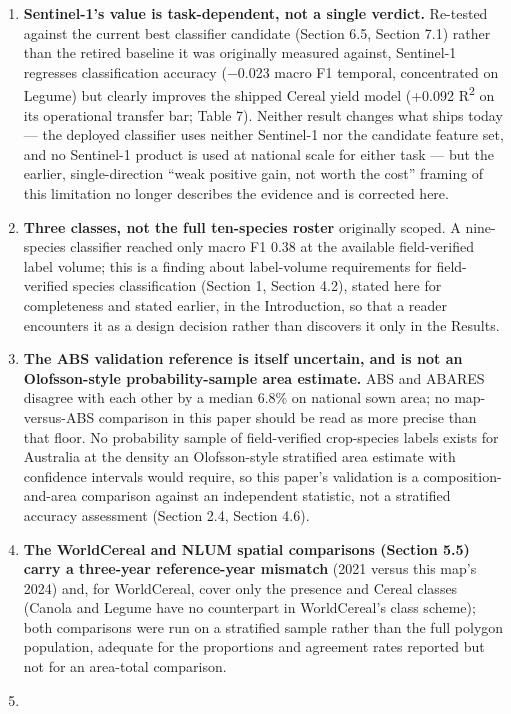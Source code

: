 \begin{enumerate}
\item
  \textbf{Sentinel-1's value is task-dependent, not a single verdict.} Re-tested against the current best classifier candidate (Section 6.5, Section 7.1) rather than the retired baseline it was originally measured against, Sentinel-1 regresses classification accuracy ($-$0.023 macro F1 temporal, concentrated on Legume) but clearly improves the shipped Cereal yield model (+0.092 R\textsuperscript{2} on its operational transfer bar; Table 7). Neither result changes what ships today --- the deployed classifier uses neither Sentinel-1 nor the candidate feature set, and no Sentinel-1 product is used at national scale for either task --- but the earlier, single-direction ``weak positive gain, not worth the cost'' framing of this limitation no longer describes the evidence and is corrected here.
\item
  \textbf{Three classes, not the full ten-species roster} originally scoped. A nine-species classifier reached only macro F1 0.38 at the available field-verified label volume; this is a finding about label-volume requirements for field-verified species classification (Section 1, Section 4.2), stated here for completeness and stated earlier, in the Introduction, so that a reader encounters it as a design decision rather than discovers it only in the Results.
\item
  \textbf{The ABS validation reference is itself uncertain, and is not an Olofsson-style probability-sample area estimate.} ABS and ABARES disagree with each other by a median 6.8\% on national sown area; no map-versus-ABS comparison in this paper should be read as more precise than that floor. No probability sample of field-verified crop-species labels exists for Australia at the density an Olofsson-style \citep{olofsson2014goodpractices} stratified area estimate with confidence intervals would require, so this paper's validation is a composition-and-area comparison against an independent statistic, not a stratified accuracy assessment (Section 2.4, Section 4.6).
\item
  \textbf{The WorldCereal and NLUM spatial comparisons (Section 5.5) carry a three-year reference-year mismatch} (2021 versus this map's 2024) and, for WorldCereal, cover only the presence and Cereal classes (Canola and Legume have no counterpart in WorldCereal's class scheme); both comparisons were run on a stratified sample rather than the full polygon population, adequate for the proportions and agreement rates reported but not for an area-total comparison.
\item

\end{enumerate}

